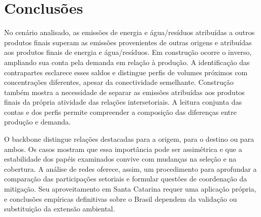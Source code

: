 \documentclass[12pt]{article}
\begin{document}
\clearpage
\section{Conclusões}

No cenário analisado, as emissões de energia e água/resíduos atribuídas a outros produtos finais superam as emissões provenientes de outras origens e atribuídas aos produtos finais de energia e água/resíduos. Em construção ocorre o inverso, ampliando sua conta pela demanda em relação à produção. A identificação das contrapartes esclarece esses saldos e distingue perfis de volumes próximos com concentrações diferentes, apesar da conectividade semelhante. Construção também mostra a necessidade de separar as emissões atribuídas aos produtos finais da própria atividade das relações intersetoriais. A leitura conjunta das contas e dos perfis permite compreender a composição das diferenças entre produção e demanda.

O backbone distingue relações destacadas para a origem, para o destino ou para ambos. Os casos mostram que essa importância pode ser assimétrica e que a estabilidade dos papéis examinados convive com mudanças na seleção e na cobertura. A análise de redes oferece, assim, um procedimento para aprofundar a comparação das participações setoriais e formular questões de coordenação da mitigação. Seu aproveitamento em Santa Catarina requer uma aplicação própria, e conclusões empíricas definitivas sobre o Brasil dependem da validação ou substituição da extensão ambiental.

\clearpage
{\renewcommand*{\bibfont}{\small}
\printbibliography[title={Referências}]
}

\end{document}
